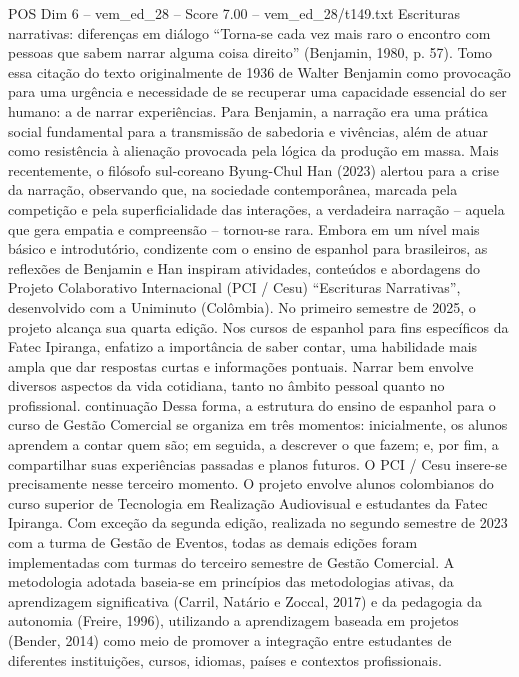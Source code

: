 \begin{textsample}{POS Dim 6 – vem\_ed\_28 – Score 7.00 – vem\_ed\_28/t149.txt}  \label{ex:f6_pos_024}
Escrituras narrativas: diferenças em diálogo “Torna-se cada vez mais raro o encontro com pessoas que sabem narrar alguma coisa direito” (Benjamin, 1980, p. 57).
Tomo essa citação do texto originalmente de 1936 de Walter Benjamin como provocação para uma urgência e necessidade de se recuperar uma capacidade essencial do ser humano: a de narrar experiências.
Para Benjamin, a narração era uma prática social fundamental para a transmissão de sabedoria e vivências, além de atuar como resistência à alienação provocada pela lógica da produção em massa.
Mais recentemente, o filósofo sul-coreano Byung-Chul Han (2023) alertou para a crise da narração, observando que, na sociedade contemporânea, marcada pela competição e pela superficialidade das interações, a verdadeira narração – aquela que gera empatia e compreensão – tornou-se rara.
Embora em um nível mais básico e introdutório, condizente com o ensino de espanhol para brasileiros, as reflexões de Benjamin e Han inspiram atividades, conteúdos e abordagens do Projeto Colaborativo Internacional (PCI / Cesu) “Escrituras Narrativas”, desenvolvido com a Uniminuto (Colômbia).
No primeiro semestre de 2025, o projeto alcança sua quarta edição.
Nos cursos de espanhol para fins específicos da Fatec Ipiranga, enfatizo a importância de saber contar, uma habilidade mais ampla que dar respostas curtas e informações pontuais.
Narrar bem envolve diversos aspectos da vida cotidiana, tanto no âmbito pessoal quanto no profissional. continuação Dessa forma, a estrutura do ensino de espanhol para o curso de Gestão Comercial se organiza em três momentos: inicialmente, os alunos aprendem a contar quem são; em seguida, a descrever o que fazem; e, por fim, a compartilhar suas experiências passadas e planos futuros.
O PCI / Cesu insere-se precisamente nesse terceiro momento.
O projeto envolve alunos colombianos do curso superior de Tecnologia em Realização Audiovisual e estudantes da Fatec Ipiranga.
Com exceção da segunda edição, realizada no segundo semestre de 2023 com a turma de Gestão de Eventos, todas as demais edições foram implementadas com turmas do terceiro semestre de Gestão Comercial.
A metodologia adotada baseia-se em princípios das metodologias ativas, da aprendizagem significativa (Carril, Natário e Zoccal, 2017) e da pedagogia da autonomia (Freire, 1996), utilizando a aprendizagem baseada em projetos (Bender, 2014) como meio de promover a integração entre estudantes de diferentes instituições, cursos, idiomas, países e contextos profissionais.

\end{textsample}
